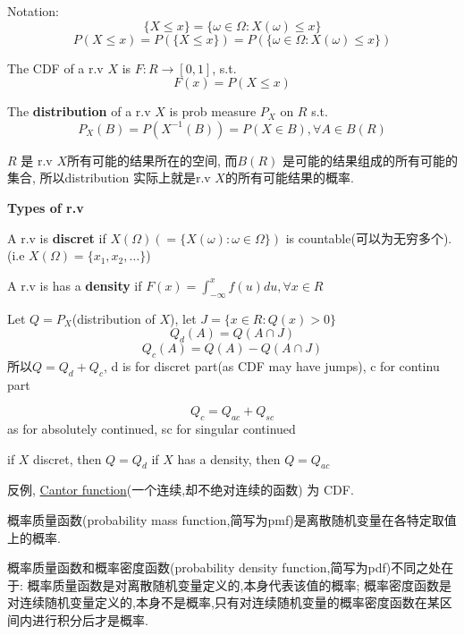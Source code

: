 \documentclass{article}
\begin{document}
Notation:\\
$$\{X \leq x\} = \{\omega \in \Omega: X(\omega) \leq x\}$$
$$P(X \leq x) = P(\{X \leq x\}) = P(\{\omega \in \Omega: X(\omega) \leq x\})$$

\begin{definition}
The CDF of a r.v $X$ is $F: R \rightarrow [0,1]$, s.t.
$$F(x) = P(X \leq x)$$
\end{definition}

\begin{definition}
The \textbf{distribution} of a r.v $X$ is prob measure $P_X$ on $R$ s.t.
$$P_X(B) = P(X^{-1}(B)) = P(X \in B), \forall A \in B(R)$$
\end{definition}
$R$ 是 r.v $X$所有可能的结果所在的空间, 而$B(R)$ 是可能的结果组成的所有可能的集合, 所以distribution 实际上就是r.v $X$的所有可能结果的概率.

\textbf{Types of r.v}
\begin{definition}
A r.v is \textbf{discret} if $X(\Omega)( = \{X(\omega): \omega \in \Omega\})$ is countable(可以为无穷多个). (i.e $X(\Omega) = \{x_1, x_2,\ldots \}$)
\end{definition}

\begin{definition}
A r.v is has a \textbf{density} if $F(x) = \int_{-\infty}^x f(u)du, \forall x \in R$
\end{definition}

Let $Q = P_X$(distribution of $X$), let $J = \{x \in R: Q(x) > 0\}$
$$Q_d(A) = Q(A \cap J)$$
$$Q_c(A) = Q(A) - Q(A \cap J)$$
所以$Q = Q_d + Q_c$, d is for discret part(as CDF may have jumps), c for continu part

$$Q_c = Q_{ac} + Q_{sc}$$
as for absolutely continued, sc for singular continued

if $X$ discret, then $Q = Q_d$
if $X$ has a density, then $Q = Q_{ac}$

反例, \href{http://en.wikipedia.org/wiki/Cantor\_function}{Cantor function}(一个连续,却不绝对连续的函数) 为 CDF.

概率质量函数(probability mass function,简写为pmf)是离散随机变量在各特定取值上的概率.

概率质量函数和概率密度函数(probability density function,简写为pdf)不同之处在于:
概率质量函数是对离散随机变量定义的,本身代表该值的概率;
概率密度函数是对连续随机变量定义的,本身不是概率,只有对连续随机变量的概率密度函数在某区间内进行积分后才是概率.
\end{document}
